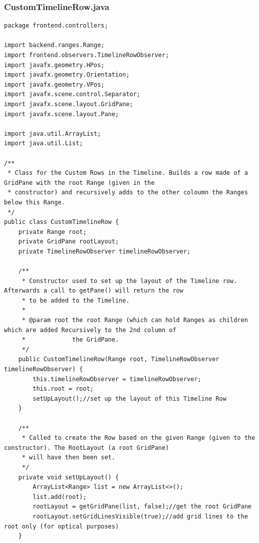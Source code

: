 \subsubsection{CustomTimelineRow.java}
\begin{lstlisting}
package frontend.controllers;

import backend.ranges.Range;
import frontend.observers.TimelineRowObserver;
import javafx.geometry.HPos;
import javafx.geometry.Orientation;
import javafx.geometry.VPos;
import javafx.scene.control.Separator;
import javafx.scene.layout.GridPane;
import javafx.scene.layout.Pane;

import java.util.ArrayList;
import java.util.List;

/**
 * Class for the Custom Rows in the Timeline. Builds a row made of a GridPane with the root Range (given in the
 * constructor) and recursively adds to the other coloumn the Ranges below this Range.
 */
public class CustomTimelineRow {
    private Range root;
    private GridPane rootLayout;
    private TimelineRowObserver timelineRowObserver;

    /**
     * Constructor used to set up the layout of the Timeline row. Afterwards a call to getPane() will return the row
     * to be added to the Timeline.
     *
     * @param root the root Range (which can hold Ranges as children which are added Recursively to the 2nd column of
     *             the GridPane.
     */
    public CustomTimelineRow(Range root, TimelineRowObserver timelineRowObserver) {
        this.timelineRowObserver = timelineRowObserver;
        this.root = root;
        setUpLayout();//set up the layout of this Timeline Row
    }

    /**
     * Called to create the Row based on the given Range (given to the constructor). The RootLayout (a root GridPane)
     * will have then been set.
     */
    private void setUpLayout() {
        ArrayList<Range> list = new ArrayList<>();
        list.add(root);
        rootLayout = getGridPane(list, false);//get the root GridPane
        rootLayout.setGridLinesVisible(true);//add grid lines to the root only (for optical purposes)
    }


\end{lstlisting}
